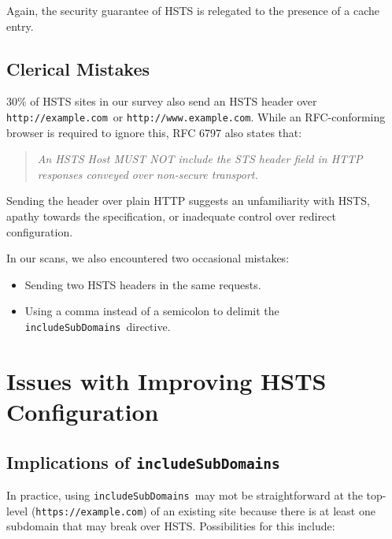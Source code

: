 \documentclass[conference]{./IEEEtran}
\newcommand{\site}[1]{\texttt{#1}}
\newcommand{\code}[1]{\texttt{#1}}
\newcommand{\iSD}{{\code{includeSubDomains}}}
\newcommand{\genericsite}{example.com}
\newcommand{\h}{{\site{http://\genericsite}}}
\newcommand{\s}{{\site{https://\genericsite}}}
\newcommand{\hw}{{\site{http://www.\genericsite}}}
\theoremstyle{plain}
\begin{document}
Again, the security guarantee of HSTS is relegated to the presence of a cache entry.

\subsection{Clerical Mistakes}

$30\%$ of HSTS sites in our survey also send an HSTS header over \h~or \hw. While an RFC-conforming browser is required to ignore this, RFC 6797\cite{rfc} also states that:

\begin{quotation}\it
An HSTS Host MUST NOT include the STS header field in HTTP responses conveyed over non-secure transport.
\end{quotation}

Sending the header over plain HTTP suggests an unfamiliarity with HSTS, apathy towards the specification, or inadequate control over redirect configuration.

In our scans, we also encountered two occasional mistakes:

\begin{itemize}
\item Sending two HSTS headers in the same requests.
\item Using a comma instead of a semicolon to delimit the \iSD~directive.
\end{itemize}


\section{Issues with Improving HSTS Configuration}

\subsection{Implications of \iSD}
\label{includeSubDomains-issues}

In practice, using \iSD~may mot be straightforward at the top-level (\s) of an existing site because there is at least one subdomain that may break over HSTS. Possibilities for this include:
\end{document}

